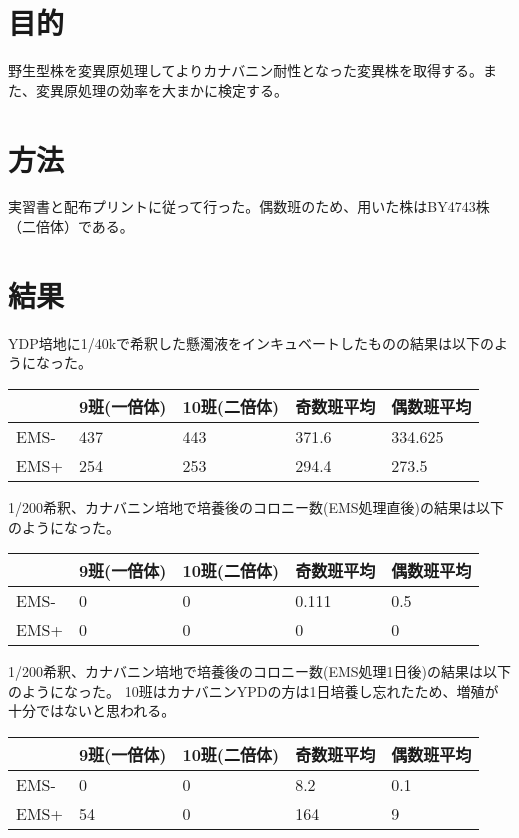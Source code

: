 \documentclass[a4paper,papersize,dvipdfmx]{jsarticle}
\begin{document}
\section*{目的}
野生型株を変異原処理してよりカナバニン耐性となった変異株を取得する。また、変異原処理の効率を大まかに検定する。

\section*{方法}
実習書と配布プリントに従って行った。偶数班のため、用いた株はBY4743株（二倍体）である。

\section*{結果}

YDP培地に1/40kで希釈した懸濁液をインキュベートしたものの結果は以下のようになった。

\begin{table}[H]
  \centering
\begin{tabular}{@{}lllll@{}}
\toprule
& 9班(一倍体) & 10班(二倍体) & 奇数班平均 & 偶数班平均         \\ \midrule
EMS-    & 437      & 443   & 371.6 & 334.625 \\
EMS+    & 254      & 253   & 294.4 & 273.5   \\ \bottomrule
\end{tabular}
\end{table}

1/200希釈、カナバニン培地で培養後のコロニー数(EMS処理直後)の結果は以下のようになった。

\begin{table}[H]
  \centering
\begin{tabular}{@{}lllll@{}}
\toprule
& 9班(一倍体) & 10班(二倍体) & 奇数班平均 & 偶数班平均    \\ \midrule
EMS-    & 0        & 0     & 0.111 & 0.5 \\
EMS+    & 0        & 0     & 0     & 0   \\ \bottomrule
\end{tabular}
\end{table}

1/200希釈、カナバニン培地で培養後のコロニー数(EMS処理1日後)の結果は以下のようになった。
10班はカナバニンYPDの方は1日培養し忘れたため、増殖が十分ではないと思われる。

\begin{table}[H]
  \centering
\begin{tabular}{@{}lllll@{}}
\toprule
& 9班(一倍体) & 10班(二倍体) & 奇数班平均 & 偶数班平均  \\ \midrule
EMS-    & 0        & 0     & 8.2   & 0.1 \\
EMS+    & 54       & 0     & 164   & 9   \\ \bottomrule
\end{tabular}
\end{table}
\end{document}
